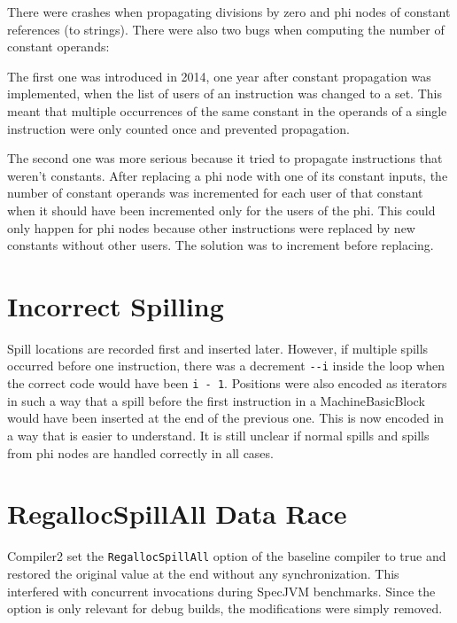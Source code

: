 \documentclass[draft,final]{vutinfth} %
\begin{document}
    There were crashes when propagating divisions by zero and phi nodes of constant references (to strings).
    There were also two bugs when computing the number of constant operands:

    The first one was introduced in 2014, one year after constant propagation was implemented,
    when the list of users of an instruction was changed to a set.
    This meant that multiple occurrences of the same constant in the operands of a single instruction
    were only counted once and prevented propagation.

    The second one was more serious because it tried to propagate instructions that weren't constants.
    After replacing a phi node with one of its constant inputs,
    the number of constant operands was incremented for each user of that constant
    when it should have been incremented only for the users of the phi.
    This could only happen for phi nodes because other instructions were replaced by new constants without other users.
    The solution was to increment before replacing.


    \section{Incorrect Spilling}

    Spill locations are recorded first and inserted later.
    However, if multiple spills occurred before one instruction,
    there was a decrement \lstinline{--i} inside the loop when the correct code would have been \lstinline{i - 1}.
    Positions were also encoded as iterators in such a way that a spill before the first instruction in a MachineBasicBlock
    would have been inserted at the end of the previous one. This is now encoded in a way that is easier to understand.
    It is still unclear if normal spills and spills from phi nodes are handled correctly in all cases.


    \section{RegallocSpillAll Data Race}

    Compiler2 set the \lstinline{RegallocSpillAll}
    option of the baseline compiler to true and restored the original value at the end without any synchronization.
    This interfered with concurrent invocations during SpecJVM benchmarks.
    Since the option is only relevant for debug builds,
    the modifications were simply removed.
\end{document}
